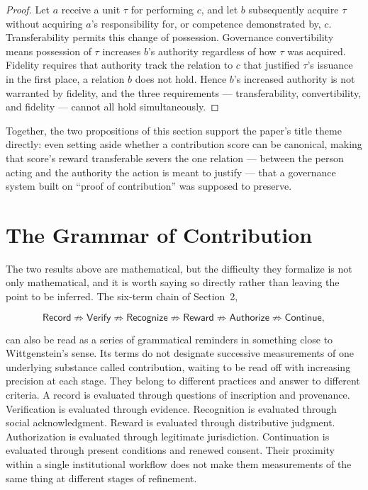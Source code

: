 \documentclass[11pt,oneside]{article}
\theoremstyle{plain}
\theoremstyle{definition}
\newcommand{\Record}{\mathsf{Record}}
\newcommand{\Verify}{\mathsf{Verify}}
\newcommand{\Recognize}{\mathsf{Recognize}}
\newcommand{\Reward}{\mathsf{Reward}}
\newcommand{\Authorize}{\mathsf{Authorize}}
\newcommand{\Continue}{\mathsf{Continue}}
\begin{document}
\begin{proof}
Let $a$ receive a unit $\tau$ for performing $c$, and let $b$ subsequently acquire $\tau$ without acquiring $a$'s responsibility for, or competence demonstrated by, $c$. Transferability permits this change of possession. Governance convertibility means possession of $\tau$ increases $b$'s authority regardless of how $\tau$ was acquired. Fidelity requires that authority track the relation to $c$ that justified $\tau$'s issuance in the first place, a relation $b$ does not hold. Hence $b$'s increased authority is not warranted by fidelity, and the three requirements --- transferability, convertibility, and fidelity --- cannot all hold simultaneously.
\end{proof}

Together, the two propositions of this section support the paper's title theme directly: even setting aside whether a contribution score can be canonical, making that score's reward transferable severs the one relation --- between the person acting and the authority the action is meant to justify --- that a governance system built on \enquote{proof of contribution} was supposed to preserve.

\section{The Grammar of Contribution}

The two results above are mathematical, but the difficulty they formalize is not only mathematical, and it is worth saying so directly rather than leaving the point to be inferred. The six-term chain of Section~2,

\begin{equation}
\Record \not\Rightarrow \Verify \not\Rightarrow \Recognize \not\Rightarrow \Reward \not\Rightarrow \Authorize \not\Rightarrow \Continue,
\end{equation}

can also be read as a series of grammatical reminders in something close to Wittgenstein's sense. Its terms do not designate successive measurements of one underlying substance called contribution, waiting to be read off with increasing precision at each stage. They belong to different practices and answer to different criteria. A record is evaluated through questions of inscription and provenance. Verification is evaluated through evidence. Recognition is evaluated through social acknowledgment. Reward is evaluated through distributive judgment. Authorization is evaluated through legitimate jurisdiction. Continuation is evaluated through present conditions and renewed consent. Their proximity within a single institutional workflow does not make them measurements of the same thing at different stages of refinement.
\end{document}
